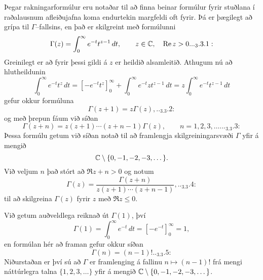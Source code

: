 \noindent
Þegar rakningarformúlur eru  notaðar til að finna beinar formúlur
fyrir stuðlana í raða\-lausnum afleiðujafna koma endurtekin
margfeldi oft fyrir.  Þá er  þægilegt að grípa til
$\Gamma$--fallsins, en það er skilgreint með formúlunni 
 \begin{equation*}\Gamma(z)=\int_0^\infty e^{-t}t^{z-1}\, dt, \qquad z\in \C, \quad \Re
z>0.


.. _3.3.1:

\end{equation*}
Greinilegt er að fyrir þessi gildi á $z$ er heildið alsamleitið.
Athugum nú að hlutheildunin
 $$\int_0^\infty e^{-t}t^{z}\, dt =\left[ -e^{-t}t^z\right]_0^\infty +
\int_0^\infty e^{-t}zt^{z-1}\, dt= z\int_0^\infty e^{-t}t^{z-1}\, dt  
 $$
gefur okkur formúluna
 \begin{equation*}\Gamma(z+1)=z\Gamma(z),


.. _3.3.2:

 \end{equation*}
og með þrepun fáum við síðan
 \begin{equation*}\Gamma(z+n)= z(z+1)\cdots(z+n-1)\Gamma(z), 
\qquad n=1,2,3,\dots.


.. _3.3.3:

 \end{equation*}
Þessa formúlu getum við síðan notað til að framlengja skilgreiningarsvæði
$\Gamma$ yfir á mengið
 $${\mathbb C}\setminus\{0,-1, -2, -3,\dots\}.
 $$
Við veljum $n$ það stórt að $\Re z+n>0$ og notum  
 \begin{equation*}\Gamma(z)=\dfrac{\Gamma(z+n)}{z(z+1)\cdots(z+n-1)},


.. _3.3.4:

 \end{equation*}
til að skilgreina ${\Gamma}(z)$ 
fyrir $z$ með $\Re z\leq 0$. 

Við getum auðveldlega reiknað út $\Gamma(1)$, því 
 $$\Gamma(1)=\int_0^\infty e^{-t}\, dt=\left[-e^{-t}\right]_0^\infty=1,
 $$
en formúlan hér að framan  gefur okkur síðan
 \begin{equation*}\Gamma(n)=(n-1)!

.. _3.3.5:

 \end{equation*}
Niðurstaðan er því sú að  ${\Gamma}$ er framlenging á fallinu 
$n\mapsto (n-1)!$ frá mengi náttúrlegra talna
$\{1,2,3,\dots\}$ yfir á mengið 
${\mathbb C}\setminus\{0,-1, -2, -3,\dots\}$.


